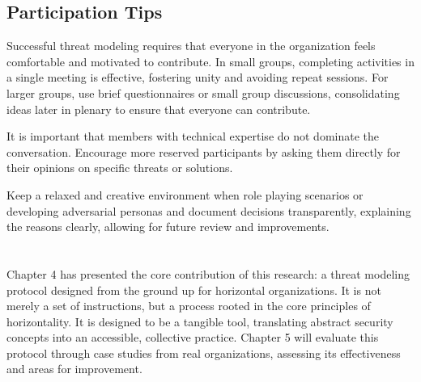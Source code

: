 \subsection{Participation Tips}
\label{subsec:participation_tips}

Successful threat modeling requires that everyone in the organization feels comfortable
and motivated to contribute. In small groups, completing activities in a single meeting is
effective, fostering unity and avoiding repeat sessions. For larger groups, use
brief questionnaires or small group discussions, consolidating ideas later in
plenary to ensure that everyone can contribute.

It is important that members with technical expertise do not dominate the
conversation. Encourage more reserved participants by asking them directly for
their opinions on specific threats or solutions.

Keep a relaxed and creative environment when role playing scenarios or
developing adversarial personas and document decisions transparently,
explaining the reasons clearly, allowing for future review and improvements.

\section*{}
Chapter 4 has presented the core contribution of this research: a threat
modeling protocol designed from the ground up for horizontal organizations. It
is not merely a set of instructions, but a process rooted in the core principles
of horizontality. It is designed to be a tangible tool, translating
abstract security concepts into an accessible, collective practice.
Chapter 5 will evaluate this protocol through case studies from real
organizations, assessing its effectiveness and areas for improvement.